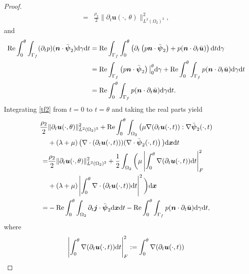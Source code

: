 \documentclass[final,leqno]{siamltex}
\begin{document}
\begin{proof}
\begin{align*}
 =& \frac{\rho_2}{2} \| \partial_t \boldsymbol u (\cdot,~ \theta)\|^2_{L^2
(\Omega_2)^3},
\end{align*}
and
\begin{align*}
 {\rm Re}\int_0^{\theta} \int_{\Gamma_f} (\partial_t p )( \boldsymbol n \cdot
\bar {\boldsymbol \psi}_2) {\rm d} \gamma {\rm d} t
 &={\rm Re} \int_{\Gamma_f} \int_0^{\theta} \left( \partial_t \left( p
\boldsymbol n \cdot \bar {\boldsymbol \psi}_2 \right)
 + p  (\boldsymbol n \cdot \partial_t \bar {\boldsymbol u})  \right){\rm d}
t{\rm d} \gamma\\
 &={\rm Re}\int_{\Gamma_f} \left( p \boldsymbol n \cdot \bar {\boldsymbol
\psi}_2 \right) \big|_0^{\theta} {\rm d} \gamma +
 {\rm Re}\int_0^{\theta} \int_{\Gamma_f} p (\boldsymbol n \cdot \partial_t \bar
{\boldsymbol u}) {\rm d} \gamma {\rm d} t\\
 &={\rm Re}\int_0^{\theta} \int_{\Gamma_f} p (\boldsymbol n \cdot \partial_t
\bar {\boldsymbol u}) {\rm d} \gamma {\rm d} t.
\end{align*}
Integrating \eqref{tf2} from $t=0$ to $t=\theta$ and taking the real parts yield
\begin{align}
 \frac{\rho_2}{2} &\| \partial_t \boldsymbol u (\cdot, \theta)\|^2_{L^2
(\Omega_2)^3} +{\rm Re}\int_0^{\theta}\int_{\Omega_2}  \big( \mu \nabla
(\partial_t \boldsymbol u (\cdot, t)) : \nabla \bar {\boldsymbol \psi}_2 (\cdot,
t)\notag\\
& +(\lambda+\mu) \left(\nabla \cdot (\partial_t \boldsymbol u (\cdot, t)))
(\nabla \cdot \bar {\boldsymbol \psi}_2 (\cdot, t) \right)\big) {\rm d}
\boldsymbol  x{\rm d }t \nonumber\\
 =&\frac{\rho_2}{2}\| \partial_t\boldsymbol u (\cdot, \theta)\|^2_{L^2
(\Omega_2)^2}
 +\frac{1}{2} \int_{\Omega_2} \bigg( \mu \left| \int_0^{\theta} \nabla
(\partial_t \boldsymbol u (\cdot, t)) {\rm d} t \right|^2_{F}\notag\\
&+ (\lambda+\mu) \left| \int_0^{\theta} \nabla \cdot (\partial_t  \boldsymbol u
(\cdot, t)) {\rm d} t \right|^2\bigg) {\rm d} \boldsymbol  x \nonumber\\
 =& - {\rm Re}\int_0^{\theta} \int_{\Omega_2} \partial_t \boldsymbol j \cdot
\bar {\boldsymbol \psi}_2 {\rm d} \boldsymbol x  {\rm d}t
 -{\rm Re}\int_0^{\theta} \int_{\Gamma_f} p (\boldsymbol n \cdot \partial_t \bar
{\boldsymbol u}) {\rm d} \gamma {\rm d} t,  \label{en2}
\end{align}
where
\[
 \left| \int_0^{\theta} \nabla ( \partial_t \boldsymbol u (\cdot, t)) {\rm d}
t\right|^2_{F}: = \int_0^{\theta} \nabla (\partial_t \boldsymbol u (\cdot, t))
\]
\end{proof}
\end{document}

